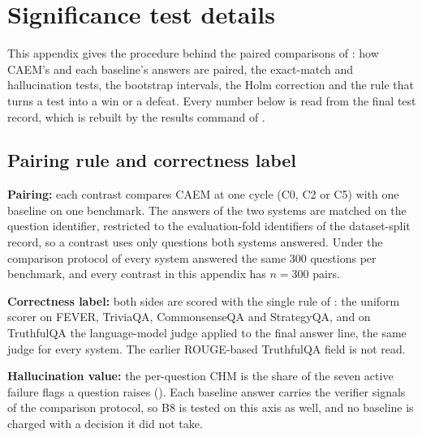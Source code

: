
\chapter{Significance test details}
\label{app:significance}

This appendix gives the procedure behind the paired comparisons of : how CAEM's and each baseline's answers are paired, the exact-match and hallucination tests, the bootstrap intervals, the Holm correction and the rule that turns a test into a win or a defeat. Every number below is read from the final test record, which is rebuilt by the results command of .

\section{Pairing rule and correctness label}
\label{app:sig-pairing}

\textbf{Pairing:} each contrast compares CAEM at one cycle (C0, C2 or C5) with one baseline on one benchmark. The answers of the two systems are matched on the question identifier, restricted to the evaluation-fold identifiers of the dataset-split record, so a contrast uses only questions both systems answered. Under the comparison protocol of  every system answered the same $300$ questions per benchmark, and every contrast in this appendix has $n = 300$ pairs.

\textbf{Correctness label:} both sides are scored with the single rule of : the uniform scorer on FEVER, TriviaQA, CommonsenseQA and StrategyQA, and on TruthfulQA the language-model judge applied to the final answer line, the same judge for every system. The earlier ROUGE-based TruthfulQA field is not read.

\textbf{Hallucination value:} the per-question CHM is the share of the seven active failure flags a question raises (). Each baseline answer carries the verifier signals of the comparison protocol, so B8 is tested on this axis as well, and no baseline is charged with a decision it did not take.

